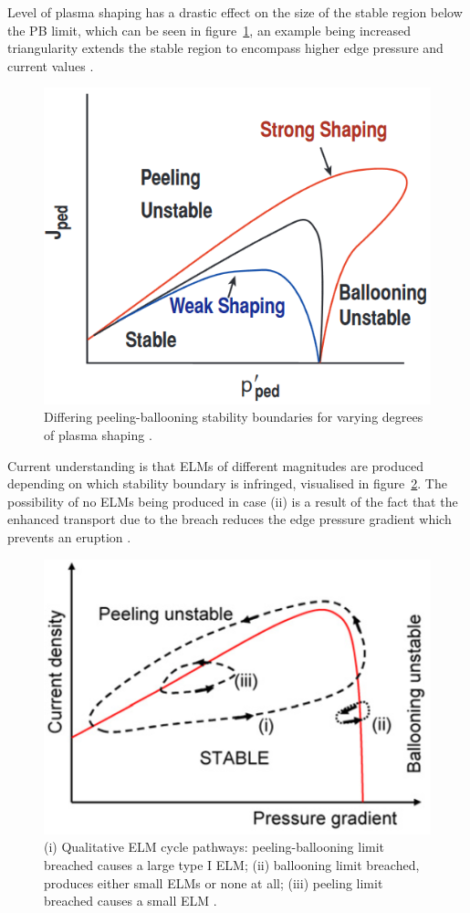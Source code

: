 \documentclass[12pt]{article}  %
\begin{document}
Level of plasma shaping has a drastic effect on the size of the stable region below the PB limit, which can be seen in figure~\ref{fig:PBshaping}, an example being increased triangularity extends the stable region to encompass higher edge pressure and current values \cite{Lang2013}.

\begin{figure}
\includegraphics[scale=0.6]{Figures/PBshaping.png}
\centering
\caption{Differing peeling-ballooning stability boundaries for varying degrees of plasma shaping \cite{Snyder2004}.}\label{fig:PBshaping}
\end{figure}

Current understanding is that ELMs of different magnitudes are produced depending on which stability boundary is infringed, visualised in figure~\ref{fig:ELMcycles}. The possibility of no ELMs being produced in case (ii) is a result of the fact that the enhanced transport due to the breach reduces the edge pressure gradient which prevents an eruption \cite{Wilson2006}.

\begin{figure}
\includegraphics[scale=0.6]{Figures/ELMcycles.png}
\centering
\caption{(i) Qualitative ELM cycle pathways: peeling-ballooning limit breached causes a large type I ELM; (ii) ballooning limit breached, produces either small ELMs or none at all; (iii) peeling limit breached causes a small ELM \cite{Wilson2006}.}\label{fig:ELMcycles}
\end{figure}
\end{document}
